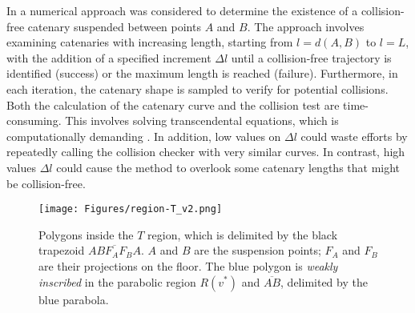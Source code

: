 



In \cite{smartinezr2023} a numerical approach was considered to determine the existence of a collision-free catenary suspended between points $A$ and $B$. The approach involves examining catenaries with increasing length, starting from $l = d(A,B)$ to $l=L$, with the addition of a specified increment $\Delta l$ until a collision-free trajectory is identified (success) or the maximum length is reached (failure). Furthermore, in each iteration, the catenary shape is sampled to verify for potential collisions.
Both the calculation of the catenary curve and the collision test are time-consuming. This involves solving transcendental equations, which is computationally demanding \cite{behroozi2014fresh}.
In addition, low values on $\Delta l$ could waste efforts by repeatedly calling the collision checker with very similar curves. In contrast, high values $\Delta l$ could cause the method to overlook some catenary lengths that might be collision-free.

\begin{figure}[t!]
  \centering
   \texttt{[image: Figures/region-T\_v2.png]}  
\caption{Polygons inside the $T$ region, which is delimited by the black trapezoid $\overline{ABF_AF_BA}$. $A$ and $B$ are the suspension points; $F_A$ and $F_B$ are their projections on the floor. The blue polygon is \emph{weakly inscribed}  in the parabolic region $R(v^*)$ and $\overline{AB}$, delimited by the blue parabola.}  %
\label{fig:PDP}
\end{figure}


